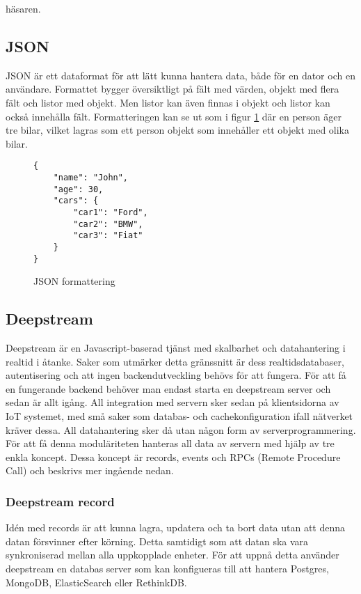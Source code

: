 häsaren.

\subsection{JSON}
JSON\cite{json} är ett dataformat för att lätt kunna hantera data, både för en dator och en användare. Formattet bygger översiktligt på fält med värden, objekt med flera fält och listor med objekt. Men listor kan även finnas i objekt och listor kan också innehålla fält. Formatteringen kan se ut som i figur \ref{fig:tim-jsonformat} där en person äger tre bilar, vilket lagras som ett person objekt som innehåller ett objekt med olika bilar.

\lstset{language=Java}
\begin{figure}[h]
  \begin{minipage}[c]{5cm}
    \begin{lstlisting}
{
    "name": "John",
    "age": 30,
    "cars": {
        "car1": "Ford",
        "car2": "BMW",
        "car3": "Fiat"
    }
} 
    \end{lstlisting}
  \caption{JSON formattering}
  \label{fig:tim-jsonformat}
  \end{minipage}
\end{figure}

\subsection{Deepstream}
\label{subsec:tim-deepstream}
Deepstream är en Javascript-baserad tjänst med skalbarhet och datahantering i realtid i åtanke. Saker som utmärker detta gränssnitt är dess realtidsdatabaser, autentisering och att ingen backendutveckling behövs för att fungera. För att få en fungerande backend behöver man endast starta en deepstream server och sedan är allt igång. All integration med servern sker sedan på klientsidorna av IoT systemet, med små saker som databas- och cachekonfiguration ifall nätverket kräver dessa. All datahantering sker då utan någon form av serverprogrammering. För att få denna moduläriteten hanteras all data av servern med hjälp av tre enkla koncept. Dessa koncept är records, events och RPCs (Remote Procedure Call) och beskrivs mer ingående nedan. 

\subsubsection{Deepstream record}
Idén med records\cite{ds:record} är att kunna lagra, updatera och ta bort data utan att denna datan försvinner efter körning. Detta samtidigt som att datan ska vara synkroniserad mellan alla uppkopplade enheter. För att uppnå detta använder deepstream en databas server som kan konfigueras till att hantera Postgres, MongoDB, ElasticSearch eller RethinkDB. 

